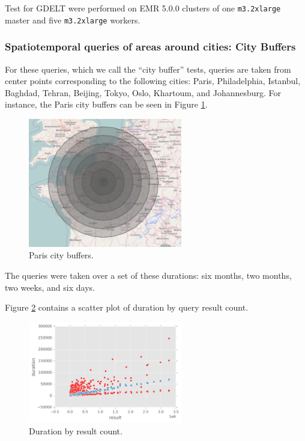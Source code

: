 Test for GDELT were performed on EMR 5.0.0 clusters of one \texttt{m3.2xlarge} master and five \texttt{m3.2xlarge} workers.

\subsubsection{Spatiotemporal queries of areas around cities: City Buffers}

For these queries, which we call the ``city buffer'' tests, queries are taken from center points corresponding to the following cities:
Paris, Philadelphia, Istanbul, Baghdad, Tehran, Beijing, Tokyo, Oslo, Khartoum, and Johannesburg.
For instance, the Paris city buffers can be seen in Figure \ref{paris}.

\begin{figure}[h!tb]
  \centering
  \includegraphics[width=0.60\textwidth]{../docs/img/gdelt/paris-city-buffers.png}
  \caption{Paris city buffers.}
  \label{paris}
\end{figure}

The queries were taken over a set of these durations: six months, two months, two weeks, and six days.

Figure \ref{durationbyresult} contains a scatter plot of duration by query result count.

\begin{figure}[h!tb]
  \centering
  \includegraphics[width=0.60\textwidth]{../docs/img/gdelt/gdelt-result-over-duration.png}
  \caption{Duration by result count.}
  \label{durationbyresult}
\end{figure}

